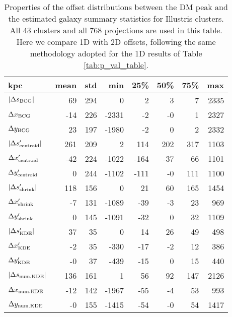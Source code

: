 \documentclass[usenatbib]{mn2e}
\begin{document}
{\begin{table}
	\begin{center}
	\caption{Properties of the offset distributions between the DM peak and the estimated galaxy summary statistics for Illustris clusters.
		All 43 clusters and all 768 projections are used in this table. Here we compare 1D with 2D offsets, following the same methodology adopted for the 1D results of Table \ref{tab:p_val_table}.
	\label{tab:offset_distributions}}
	\begin{tabular}{lrrrrrrr}
\toprule
kpc &  mean &  std &   min &  25\% &  50\% &  75\% &  max \\
\midrule
$|\Delta s_{\rm BCG}|$       &    69 &  294 &     0 &    2 &    3 &    7 & 2335 \\
$\Delta x_{\rm BCG}$         &   -14 &  226 & -2331 &   -2 &   -0 &    1 & 2327 \\
$\Delta y_{\rm BCG}$         &    23 &  197 & -1980 &   -2 &    0 &    2 & 2332 \\
$|\Delta s_{\rm centroid}'|$ &   261 &  209 &     2 &  114 &  202 &  317 & 1103 \\
$\Delta x_{\rm centroid}'$   &   -42 &  224 & -1022 & -164 &  -37 &   66 & 1101 \\
$\Delta y_{\rm centroid}'$   &     0 &  244 & -1102 & -111 &   -0 &  111 & 1100 \\
$|\Delta s_{\rm shrink}'|$   &   118 &  156 &     0 &   21 &   60 &  165 & 1454 \\
$\Delta x_{\rm shrink}'$     &    -7 &  131 & -1089 &  -39 &   -3 &   23 &  969 \\
$\Delta y_{\rm shrink}'$     &     0 &  145 & -1091 &  -32 &    0 &   32 & 1109 \\
$|\Delta s_{\rm KDE}'|$      &    37 &   35 &     0 &   14 &   26 &   49 &  498 \\
$\Delta x_{\rm KDE}'$        &    -2 &   35 &  -330 &  -17 &   -2 &   12 &  386 \\
$\Delta y_{\rm KDE}'$        &    -0 &   37 &  -439 &  -15 &    0 &   15 &  440 \\
$|\Delta s_{\rm num. KDE}|$    &   136 &  161 &     1 &   56 &   92 &  147 & 2126 \\
$\Delta x_{\rm num. KDE}$    &   -12 &  142 & -1967 &  -55 &   -4 &   53 &  993 \\
$\Delta y_{\rm num. KDE}$    &    -0 &  155 & -1415 &  -54 &   -0 &   54 & 1417 \\
\bottomrule
\end{tabular}


\end{center}
\end{table}}
\end{document}
